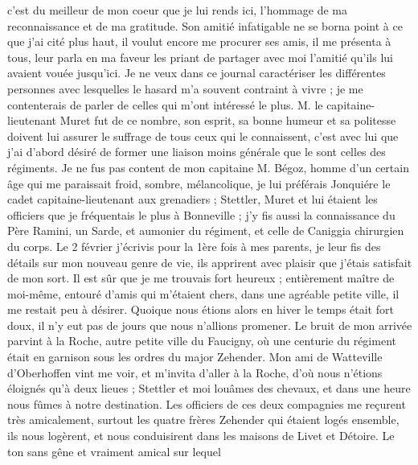 \documentclass[12pt]{article}
\begin{document}
 c’est du meilleur de mon coeur que je lui rends ici,
l’hommage de ma reconnaissance et de ma gratitude. Son amitié infatigable ne se borna point à ce que
j’ai cité plus haut, il voulut encore me procurer ses amis, il me présenta à tous, leur parla en ma
faveur les priant de partager avec moi l’amitié qu’ils lui avaient vouée jusqu’ici. Je ne veux dans
ce journal caractériser les différentes personnes avec lesquelles le hasard m’a souvent contraint à
vivre ; je me contenterais de parler de celles qui m’ont intéressé le plus. M. le
capitaine-lieutenant Muret fut de ce nombre, son esprit, sa bonne humeur et sa politesse doivent lui
assurer le suffrage de tous ceux qui le connaissent, c’est avec lui que j’ai d’abord désiré de
former une liaison moins générale que le sont celles des régiments. Je ne fus pas content de mon
capitaine M. Bégoz, homme d’un certain âge qui me paraissait froid, sombre, mélancolique, je lui
préférais Jonquiére le cadet capitaine-lieutenant aux grenadiers ; Stettler, Muret et lui étaient
les officiers que je fréquentais le plus à Bonneville ; j’y fis aussi la connaissance du Père
Ramini, un Sarde, et aumonier du régiment, et celle de Caniggia chirurgien du corps. Le 2 février
j’écrivis pour la 1ère fois à mes parents, je leur fis des détails sur mon nouveau genre de vie, ils
apprirent avec plaisir que j’étais satisfait de mon sort. Il est sûr que je me trouvais fort heureux
; entièrement maître de moi-même, entouré d’amis qui m’étaient chers, dans une agréable petite
ville, il me restait peu à désirer. Quoique nous étions alors en hiver le temps était fort doux, il
n’y eut pas de jours que nous n’allions promener. Le bruit de mon arrivée parvint à la Roche, autre
petite ville du Faucigny, où une centurie du régiment était en garnison sous les ordres du major
Zehender. Mon ami de Watteville d’Oberhoffen vint me voir, et m’invita d’aller à la Roche, d’où nous
n’étions éloignés qu’à deux lieues ; Stettler et moi louâmes des chevaux, et dans une heure nous
fûmes à notre destination. Les officiers de ces deux compagnies me reçurent très amicalement,
surtout les quatre frères Zehender qui étaient logés ensemble, ils nous logèrent, et nous
conduisirent dans les maisons de Livet et Détoire. Le ton sans gêne et vraiment amical sur lequel
\end{document}
